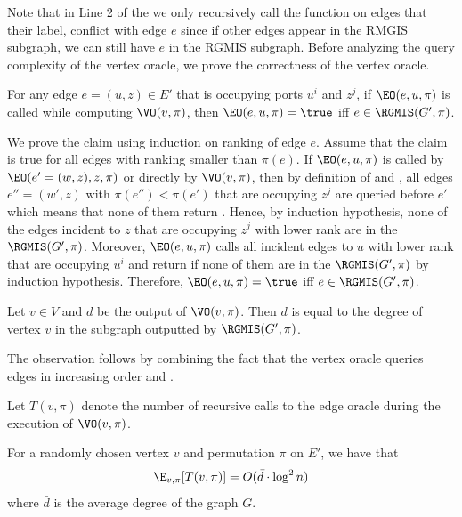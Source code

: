 Note that in Line 2 of the  we only recursively call the function on edges that their label, conflict with edge $e$ since if other edges appear in the RMGIS subgraph, we can still have $e$ in the RGMIS subgraph. Before analyzing the query complexity of the vertex oracle, we prove the correctness of the vertex oracle.

\begin{claim}\label{clm:correctness-edge-oracle}
For any edge $e = (u, z) \in E'$ that is occupying ports $u^i$ and $z^j$, if $\EO(e, u, \pi)$ is called while computing $\VO(v, \pi)$, then $\EO(e, u, \pi) = \true$ iff $e \in \RGMIS(G', \pi)$.
\end{claim}
\begin{myproof}
We prove the claim using induction on ranking of edge $e$. Assume that the claim is true for all edges with ranking smaller than $\pi(e)$. If $\EO(e, u, \pi)$ is called by $\EO(e' = (w, z), z, \pi)$ or directly by $\VO(v, \pi)$, then by definition of  and , all edges $e'' = (w', z)$ with $\pi(e'') < \pi(e')$ that are occupying $z^j$ are queried before $e'$ which means that none of them return \true{}. Hence, by induction hypothesis, none of the edges incident to $z$ that are occupying $z^j$ with lower rank are in the $\RGMIS(G', \pi)$. Moreover, $\EO(e, u, \pi)$ calls all incident edges to $u$ with lower rank that are occupying $u^i$ and return \true{} if none of them are in the $\RGMIS(G', \pi)$ by induction hypothesis. Therefore, $\EO(e, u, \pi) = \true$ iff $e \in \RGMIS(G', \pi)$.
\end{myproof}

\begin{claim}
Let $v \in V$ and $d$ be the output of $\VO(v, \pi)$. Then $d$ is equal to the degree of vertex $v$ in the subgraph outputted by $\RGMIS(G', \pi)$.
\end{claim}
\begin{myproof}
The observation follows by combining the fact that the vertex oracle queries edges in increasing order and .
\end{myproof}


Let $T(v, \pi)$ denote the number of recursive calls to the edge oracle during the execution of $\VO(v, \pi)$.

\begin{theorem}\label{thm: query-complexity}
For a randomly chosen vertex $v$ and permutation $\pi$ on $E'$, we have that
\begin{align*}
    \E_{v, \pi}[T(v,\pi)] = O(\bar{d}\cdot \log^2 n)
\end{align*}
where $\bar{d}$ is the average degree of the graph $G$.
\end{theorem}

